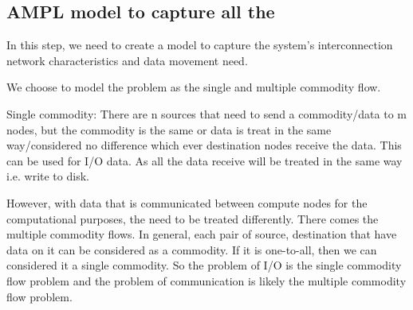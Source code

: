 \documentclass[letter]{article}
\begin{document}
\subsection {AMPL model to capture all the }
In this step, we need to create a model to capture the system's interconnection network characteristics and data movement need. 

We choose to model the problem as the single and multiple commodity flow.

Single commodity: There are n sources that need to send a commodity/data to m nodes, but the commodity is the same or data is treat in the same way/considered no difference which ever destination nodes receive the data. This can be used for I/O data. As all the data receive will be treated in the same way i.e. write to disk. 

However, with data that is communicated between compute nodes for the computational purposes, the need to be treated differently. There comes the multiple commodity flows. In general, each pair of source, destination that have data on it can be considered as a commodity. If it is one-to-all, then we can considered it a single commodity. So the problem of I/O is the single commodity flow problem and the problem of communication is likely the multiple commodity flow problem.
\end{document}
